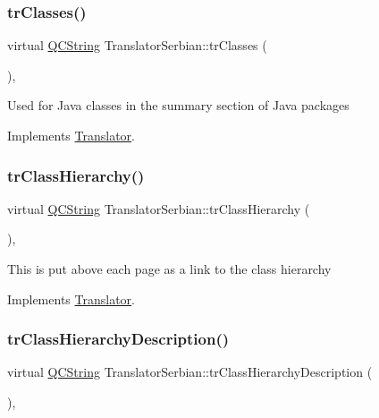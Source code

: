 \mbox{\label{class_translator_serbian_ad53d90c20d2d8a5fd58814b294bff88f}} 
\subsubsection{\texorpdfstring{trClasses()}{trClasses()}}
{\footnotesize\ttfamily virtual \mbox{\hyperlink{class_q_c_string}{Q\+C\+String}} Translator\+Serbian\+::tr\+Classes (\begin{DoxyParamCaption}{ }\end{DoxyParamCaption})\hspace{0.3cm}{\ttfamily [inline]}, {\ttfamily [virtual]}}

Used for Java classes in the summary section of Java packages 

Implements \mbox{\hyperlink{class_translator}{Translator}}.

\mbox{\label{class_translator_serbian_aa434e5be18a069fc783a0dec73c3e8bf}} 
\subsubsection{\texorpdfstring{trClassHierarchy()}{trClassHierarchy()}}
{\footnotesize\ttfamily virtual \mbox{\hyperlink{class_q_c_string}{Q\+C\+String}} Translator\+Serbian\+::tr\+Class\+Hierarchy (\begin{DoxyParamCaption}{ }\end{DoxyParamCaption})\hspace{0.3cm}{\ttfamily [inline]}, {\ttfamily [virtual]}}

This is put above each page as a link to the class hierarchy 

Implements \mbox{\hyperlink{class_translator}{Translator}}.

\mbox{\label{class_translator_serbian_a94ecdac3e5a4843b58450e3701bb7912}} 
\subsubsection{\texorpdfstring{trClassHierarchyDescription()}{trClassHierarchyDescription()}}
{\footnotesize\ttfamily virtual \mbox{\hyperlink{class_q_c_string}{Q\+C\+String}} Translator\+Serbian\+::tr\+Class\+Hierarchy\+Description (\begin{DoxyParamCaption}{ }\end{DoxyParamCaption})\hspace{0.3cm}{\ttfamily [inline]}, {\ttfamily [virtual]}}

